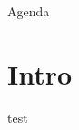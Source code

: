 \documentclass{beamer}
\begin{document}
  \begin{frame}{Agenda}
    \tableofcontents
  \end{frame}

  \section{Intro}
  \begin{frame}
    test
  \end{frame}
\end{document}
